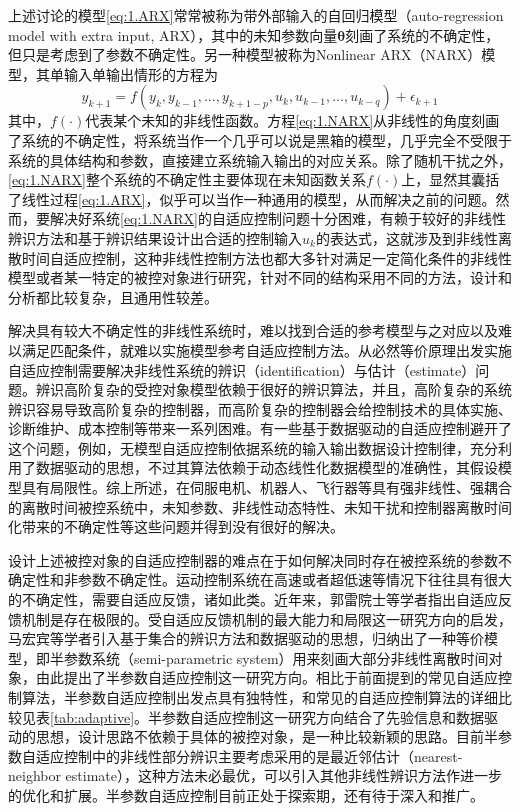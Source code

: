 上述讨论的模型\eqref{eq:1.ARX}常常被称为带外部输入的自回归模型（auto-regression model with extra input, ARX），其中的未知参数向量$\bm{\theta}$刻画了系统的不确定性，但只是考虑到了参数不确定性。另一种模型被称为Nonlinear ARX（NARX）模型，其单输入单输出情形的方程为
\begin{equation}%
\label{eq:1.NARX}
y_{k+1} = f(y_{k},y_{k-1},\ldots,y_{k+1-p},u_{k},u_{k-1},\ldots,u_{k-q})+\epsilon_{k+1}
\end{equation}
其中，$f(\cdot)$代表某个未知的非线性函数。方程\eqref{eq:1.NARX}从非线性的角度刻画了系统的不确定性，将系统当作一个几乎可以说是黑箱的模型，几乎完全不受限于系统的具体结构和参数，直接建立系统输入输出的对应关系。除了随机干扰之外，\eqref{eq:1.NARX}整个系统的不确定性主要体现在未知函数关系$f(\cdot)$上，显然其囊括了线性过程\eqref{eq:1.ARX}，似乎可以当作一种通用的模型，从而解决之前的问题。然而，要解决好系统\eqref{eq:1.NARX}的自适应控制问题十分困难，有赖于较好的非线性辨识方法和基于辨识结果设计出合适的控制输入$u_{k}$的表达式，这就涉及到非线性离散时间自适应控制，这种非线性控制方法也都大多针对满足一定简化条件的非线性模型或者某一特定的被控对象进行研究，针对不同的结构采用不同的方法，设计和分析都比较复杂，且通用性较差。

解决具有较大不确定性的非线性系统时，难以找到合适的参考模型与之对应以及难以满足匹配条件，就难以实施模型参考自适应控制方法。从必然等价原理出发实施自适应控制需要解决非线性系统的辨识（identification）与估计（estimate）问题。辨识高阶复杂的受控对象模型依赖于很好的辨识算法，并且，高阶复杂的系统辨识容易导致高阶复杂的控制器，而高阶复杂的控制器会给控制技术的具体实施、诊断维护、成本控制等带来一系列困难。有一些基于数据驱动的自适应控制避开了这个问题，例如，无模型自适应控制依据系统的输入输出数据设计控制律，充分利用了数据驱动的思想，不过其算法依赖于动态线性化数据模型的准确性，其假设模型具有局限性。综上所述，在伺服电机、机器人、飞行器等具有强非线性、强耦合的离散时间被控系统中，未知参数、非线性动态特性、未知干扰和控制器离散时间化带来的不确定性等这些问题并得到没有很好的解决。

设计上述被控对象的自适应控制器的难点在于如何解决同时存在被控系统的参数不确定性和非参数不确定性。运动控制系统在高速或者超低速等情况下往往具有很大的不确定性，需要自适应反馈，诸如此类。近年来，郭雷院士等学者指出自适应反馈机制是存在极限的。受自适应反馈机制的最大能力和局限这一研究方向的启发，马宏宾等学者引入基于集合的辨识方法和数据驱动的思想，归纳出了一种等价模型，即半参数系统（semi-parametric system）用来刻画大部分非线性离散时间对象，由此提出了半参数自适应控制这一研究方向。相比于前面提到的常见自适应控制算法，半参数自适应控制出发点具有独特性，和常见的自适应控制算法的详细比较见表\eqref{tab:adaptive}。半参数自适应控制这一研究方向结合了先验信息和数据驱动的思想，设计思路不依赖于具体的被控对象，是一种比较新颖的思路。目前半参数自适应控制中的非线性部分辨识主要考虑采用的是最近邻估计（nearest-neighbor estimate），这种方法未必最优，可以引入其他非线性辨识方法作进一步的优化和扩展。半参数自适应控制目前正处于探索期，还有待于深入和推广。

